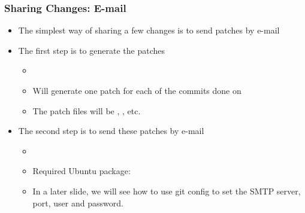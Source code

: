 \begin{frame}
  \frametitle{Sharing Changes: E-mail}
  \begin{itemize}
  \item The simplest way of sharing a few changes is to send patches
    by e-mail
  \item The first step is to generate the patches
    \begin{itemize}
    \item {}
    \item Will generate one patch for each of the commits done on
    \item The patch files will be , ,
      etc.
    \end{itemize}
  \item The second step is to send these patches by e-mail
    \begin{itemize}
    \item {}
    \end{itemize}
    \begin{itemize}
    \item Required Ubuntu package: 
    \item In a later slide, we will see how to use git config to set
      the SMTP server, port, user and password.
    \end{itemize}
  \end{itemize}
\end{frame}


